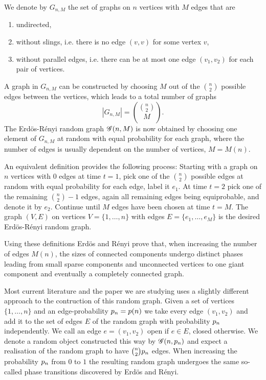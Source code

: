 We denote by $G_{n,M}$ the set of graphs on $n$ vertices with $M$ edges that are
\begin{enumerate}
	\item undirected,
	\item without slings, i.e. there is no edge $(v,v)$ for some vertex $v$,
	\item without parallel edges, i.e. there can be at most one edge $(v_1, v_2)$ for each pair of vertices.
\end{enumerate}
A graph in $G_{n,M}$ can be constructed by choosing $M$ out of the $\binom{n}{2}$ possible edges between the vertices,
which leads to a total number of graphs
\begin{equation}
	|G_{n,M}| = \binom{\binom{n}{2}}{M}.
\end{equation}
The Erdös-Rényi random graph $\mathscr{G}(n, M)$ is now obtained by choosing one element of $G_{n,M}$ at random
with equal probability for each graph, where the number of edges is usually dependent on the number of vertices, $M = M(n)$.

An equivalent definition provides the following process:
Starting with a graph on $n$ vertices with $0$ edges at time $t=1$, 
pick one of the $\binom{n}{2}$ possible edges at random with equal probability for each edge,
label it $e_1$.
At time $t=2$ pick one of the remaining $\binom{n}{2}-1$ edges, again all remaining edges being equiprobable,
and denote it by $e_2$.
Continue until $M$ edges have been chosen at time $t=M$.
The graph $(V,E)$ on vertices $V = \{1, \dots, n\}$ with edges $E = \{e_1, \dots, e_M\}$ is the desired Erdös-Rényi random graph.

Using these definitions Erdös and Rényi prove that,
when increasing the number of edges $M(n)$,
the sizes of connected components undergo distinct phases leading from small sparse components and unconnected vertices
to one giant component and eventually a completely connected graph.

Most current literature and the paper we are studying uses a slightly different approach to the contruction of this random graph.
Given a set of vertices $\{1, \dots, n\}$ and an edge-probability $p_n = p(n)$
we take every edge $(v_1, v_2)$ and add it to the set of edges $E$ of the random graph with probability $p_n$ independently.
We call an edge $e = (v_1, v_2)$ open if $e \in E$, closed otherwise.
We denote a random object constructed this way by $\mathscr{G}(n, p_n)$ and expect a realisation of the random graph to have $\binom{n}{2}p_n$ edges.
When increasing the probability $p_n$ from $0$ to $1$ the resulting random graph undergoes the same so-called phase transitions
discovered by Erdös and Rényi.

